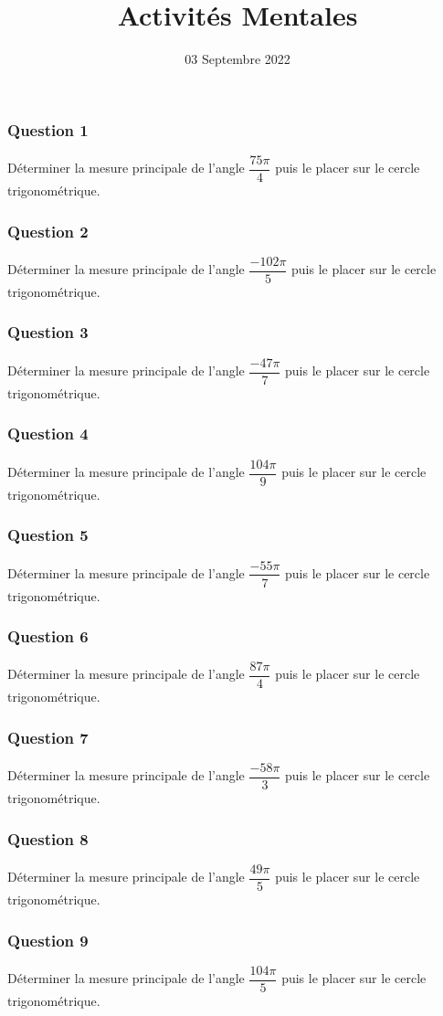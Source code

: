\documentclass[15pt, mathserif]{beamer}
\title{Activités Mentales}
\date{03 Septembre 2022}
\begin{document}
\begin{frame}
    \titlepage
\end{frame}

\begin{frame} 
	\frametitle{Question 1}
Déterminer la mesure principale de l'angle $\dfrac{75\pi}{4}$ puis le placer sur le cercle trigonométrique.\end{frame}


\begin{frame} 
	\frametitle{Question 2}
Déterminer la mesure principale de l'angle $\dfrac{-102\pi}{5}$ puis le placer sur le cercle trigonométrique.\end{frame}


\begin{frame} 
	\frametitle{Question 3}
Déterminer la mesure principale de l'angle $\dfrac{-47\pi}{7}$ puis le placer sur le cercle trigonométrique.\end{frame}


\begin{frame} 
	\frametitle{Question 4}
Déterminer la mesure principale de l'angle $\dfrac{104\pi}{9}$ puis le placer sur le cercle trigonométrique.\end{frame}


\begin{frame} 
	\frametitle{Question 5}
Déterminer la mesure principale de l'angle $\dfrac{-55\pi}{7}$ puis le placer sur le cercle trigonométrique.\end{frame}


\begin{frame} 
	\frametitle{Question 6}
Déterminer la mesure principale de l'angle $\dfrac{87\pi}{4}$ puis le placer sur le cercle trigonométrique.\end{frame}


\begin{frame} 
	\frametitle{Question 7}
Déterminer la mesure principale de l'angle $\dfrac{-58\pi}{3}$ puis le placer sur le cercle trigonométrique.\end{frame}


\begin{frame} 
	\frametitle{Question 8}
Déterminer la mesure principale de l'angle $\dfrac{49\pi}{5}$ puis le placer sur le cercle trigonométrique.\end{frame}


\begin{frame} 
	\frametitle{Question 9}
Déterminer la mesure principale de l'angle $\dfrac{104\pi}{5}$ puis le placer sur le cercle trigonométrique.\end{frame}
\end{document}
